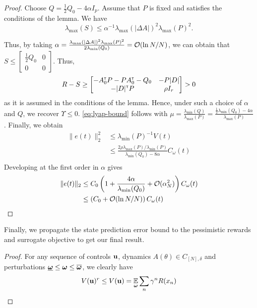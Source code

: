 \begin{subappendices}
\begin{proof}
		Choose $Q = \frac{1}{2}Q_0-4\alpha I_p$.
		Assume that $P$ is fixed and satisfies the conditions of the lemma. We have $$\lambda_{\max}(S) \leq \alpha^{-1}\lambda_{\max}(|\Delta A|)^2\lambda_{\max}(P)^2.$$
		
		Thus, by taking $\alpha = \frac{\lambda_{\max}(|\Delta A|)^2\lambda_{\max}(P)^2}{2\lambda_{\min}(Q_0)} = \mathcal{O}(\ln N / N)$, we can obtain that $S \leq \begin{bmatrix}
		\frac{1}{2}Q_0 & 0\\0 & 0
		\end{bmatrix}$. Thus,
		\[R-S \geq \begin{bmatrix}
		-A_0^{\mathsf{\scriptscriptstyle T}} P - P A_0^{\mathsf{\scriptscriptstyle T}} - Q_0 & -P|D|\\
		-|D|^{\mathsf{\scriptscriptstyle T}} P & \rho I_r\\
		\end{bmatrix} > 0 \]
		as it is assumed in the conditions of the lemma. Hence, under such a choice of $\alpha$ and $Q$, we recover $\Upsilon\leq 0$. \eqref{eq:lyap-bound} follows with $\mu = \frac{\lambda_{\min}(Q)}{\lambda_{\max}(P)} = \frac{\frac{1}{2}\lambda_{\min}(Q_0) - 4\alpha}{\lambda_{\max}(P)}$.
		Finally, we obtain
		\begin{align*}
		\|e(t)\|_2^2 &\leq \lambda_{\min}(P)^{-1} V(t)\\
		& \leq \frac{2\rho\lambda_{\max}(P)/\lambda_{\min}(P)}{\lambda_{\min}(Q_0) - 8\alpha} C_\omega(t)\\
		\end{align*}
		Developing at the first order in $\alpha$ gives
		\begin{align*}
		\|e(t)\|_2 &\leq C_0\left(1 + \frac{4\alpha}{\lambda_{\min}(Q_0)} + \mathcal{O}(\alpha_N^2)\right)C_\omega(t)\\
		&\leq \left(C_0 + \mathcal{O}(\ln N/N)\right)C_\omega(t)
		\end{align*}
	\end{proof}
	
	
	Finally, we propagate the state prediction error bound to the pessimistic rewards and surrogate objective to get our final result.
	\begin{proof}
		
		For any sequence of controls $\mathbf{u}$, dynamics $A(\theta)\in C_{[N],\delta}$ and perturbations $\underline{\bm{\omega}} \leq \bm{\omega} \leq \overline{\bm{\omega}}$, we clearly have 
		\[V(\mathbf{u})^r \leq V(\mathbf{u}) = \operatorname*{\mathbb{E}}_{\bm{\omega}}\sum_n \gamma^n R(x_n)\]
		

\end{proof}
\end{subappendices}
